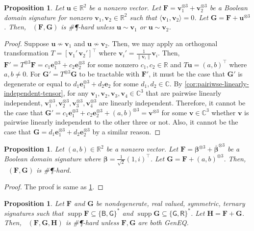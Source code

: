 \documentclass[11pt]{article}
\newtheorem{proposition}[theorem]{Proposition}
\DeclareMathOperator{\holbs}{Holant^*_2}
\DeclareMathOperator{\holts}{Holant^*_3}
\DeclareMathOperator{\supp}{supp}
\newcommand{\db}{\mathsf{B}}
\newcommand{\dg}{\mathsf{G}}
\newcommand{\dr}{\mathsf{R}}
\newcommand{\geneq}{\textsf{GenEQ}\xspace}
\newcommand{\sph}{\#\P-hard\xspace}
\newcommand{\teh}{^{\otimes 3}}
\newcommand{\transpose}{^\intercal}
\begin{document}
\begin{proposition}\label{prop:geneq-sum-hard}
Let $\mathbf{u} \in \mathbb{R}^2$ be a nonzero vector.
Let $\mathbf{F} = \mathbf{v}_1\teh + \mathbf{v}_2 \teh$ be a Boolean domain signature for nonzero $\mathbf{v}_1, \mathbf{v}_2 \in \mathbb{R}^2$ such that $\langle \mathbf{v}_1, \mathbf{v}_2 \rangle = 0$.
Let $\mathbf{G} = \mathbf{F} + \mathbf{u}\teh$.
Then, $\holbs(\mathbf{F}, \mathbf{G})$ is \sph unless $\mathbf{u} \sim \mathbf{v}_1$ or $\mathbf{u} \sim \mathbf{v}_2$.
\end{proposition}
\begin{proof}
Suppose $\mathbf{u} \not\sim \mathbf{v}_1$ and $\mathbf{u} \not \sim \mathbf{v}_2$.
Then, we may apply an orthogonal transformation $T = [\mathbf{v}_1' \, \mathbf{v}_2']\transpose$ where $\mathbf{v}_i' = \frac{1}{\|\mathbf{v}_i\|}\mathbf{v}_i$.
Then, $\mathbf{F}' = T \teh \mathbf{F}  = c_1 \mathbf{e}_1\teh + c_2 \mathbf{e}_2\teh$ for some nonzero $c_1, c_2 \in \mathbb{R}$ and $T \mathbf{u} = (a, b)\transpose$ where $a, b \ne 0$.
For $\mathbf{G}' = T\teh \mathbf{G}$ to be tractable with $\mathbf{F}'$, it must be the case that $\mathbf{G}'$ is degenerate or equal to $d_1 \mathbf{e}_1 \teh + d_2 \mathbf{e}_2$ for some $d_1, d_2 \in \mathbb{C}$.
By \cref{cor:pairiwse-linearly-independent-tensor}, for any $\mathbf{v}_1, \mathbf{v}_2, \mathbf{v}_3, \mathbf{v}_4 \in \mathbb{C}^3$ that are pairwise linearly independent, 
$\mathbf{v}_1\teh, \mathbf{v}_2 \teh, \mathbf{v}_3 \teh, \mathbf{v}_4\teh$ are linearly independent.
Therefore, it cannot be the case that $\mathbf{G}' = c_1 \mathbf{e}_1\teh + c_2 \mathbf{e}_2 \teh + (a, b)\teh = \mathbf{v}\teh$ for some $\mathbf{v} \in \mathbb{C}^3$ whether $\mathbf{v}$ is pairwise linearly independent to the other three or not. 
Also, it cannot be the case that $\mathbf{G} = d_1 \mathbf{e}_1 \teh + d_2 \mathbf{e}_2 \teh$ by a similar reason.
\end{proof}
\begin{proposition}\label{prop:z-sum-hard}
Let $(a, b) \in \mathbb{R}^2$ be a nonzero vector.
Let $\mathbf{F} = \boldsymbol{\beta}\teh + \overline{\boldsymbol{\beta}}\teh$ be a Boolean domain signature where $\boldsymbol{\beta} = \frac{1}{\sqrt{2}}(1, i)\transpose$.
Let $\mathbf{G} = \mathbf{F} + (a, b)\teh$.
Then, $\holbs(\mathbf{F}, \mathbf{G})$ is \sph.
\end{proposition}
\begin{proof}
  The proof is same as \cref{prop:geneq-sum-hard}.
\end{proof}
\begin{proposition}\label{prop:bg-gr-sum-hard}
Let $\mathbf{F}$ and $\mathbf{G}$ be nondegenerate, real valued, symmetric, ternary signatures such that $\supp \mathbf{F} \subseteq \{\db, \dg\}^*$ and $\supp \mathbf{G} \subseteq \{\dg, \dr\}^*$.
Let $\mathbf{H} = \mathbf{F} + \mathbf{G}$.
Then, $\holts(\mathbf{F}, \mathbf{G}, \mathbf{H})$ is \sph unless $\mathbf{F}, \mathbf{G}$ are both \geneq.
\end{proposition}
\end{document}
